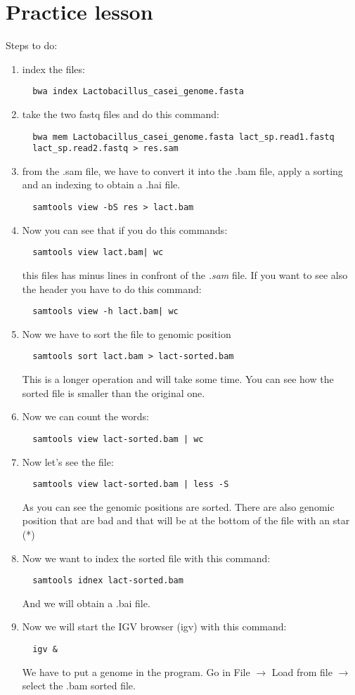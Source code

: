\section{Practice lesson}
Steps to do:
\begin{enumerate}
  \item index the files:
  \begin{verbatim}
  bwa index Lactobacillus_casei_genome.fasta
  \end{verbatim}
  \item take the two fastq files and do this command:
  \begin{verbatim}
  bwa mem Lactobacillus_casei_genome.fasta lact_sp.read1.fastq
  lact_sp.read2.fastq > res.sam
  \end{verbatim}
  \item from the .sam file, we have to convert it into the .bam file, apply a
  sorting and an indexing to obtain a .hai file.
  \begin{verbatim}
  samtools view -bS res > lact.bam
  \end{verbatim}
  \item Now you can see that if you do this commands:
  \begin{verbatim}
  samtools view lact.bam| wc
  \end{verbatim}
  this files has minus lines in confront of the \textit{.sam} file. If you want
  to see also the header you have to do this command:
  \begin{verbatim}
  samtools view -h lact.bam| wc
  \end{verbatim}
  \item Now we have to sort the file to genomic position %
  \begin{verbatim}
  samtools sort lact.bam > lact-sorted.bam
  \end{verbatim}
  This is a longer operation and will take some time. You can see how the
  sorted file is smaller than the original one.
  \item Now we can count the words:
  \begin{verbatim}
  samtools view lact-sorted.bam | wc
  \end{verbatim}
  \item Now let's see the file:
  \begin{verbatim}
  samtools view lact-sorted.bam | less -S
  \end{verbatim}
  As you can see the genomic positions are sorted. There are also genomic
  position that are bad and that will be at the bottom of the file with an star
  (*)
  \item Now we want to index the sorted file with this command:
  \begin{verbatim}
  samtools idnex lact-sorted.bam
  \end{verbatim}
  And we will obtain a .bai file.
  \item Now we will start the IGV browser (igv) with this command:
  \begin{verbatim}
  igv &
  \end{verbatim}
  We have to put a genome in the program. Go in File $\to$ Load from file $\to$
  select the .bam sorted file.
\end{enumerate}

